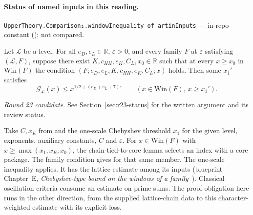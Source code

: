 

\paragraph{Status of named inputs in this reading.}
\noindent\nolinkurl{UpperTheory.Comparison₂.windowInequality_of_artinInputs} --- in-repo constant (); not compared.\par

\begin{formalstatement}\label{pn:P017}
Let $\mathcal L$ be a level. For all $e_D,e_L\in\mathbb R$, $\varepsilon>0$, and every family $F$ at $\varepsilon$ satisfying $(\mathcal L,F)$, suppose there exist $K,c_{HH},e_K,C_L,x_0\in\mathbb R$ such that at every $x\ge x_0$ in $\mathrm{Win}(F)$ the condition $(F;e_D,e_L,K,c_{HH},e_K,C_L;x)$ holds. Then some $x_1'$ satisfies
\[
 \mathcal G_{\mathcal L}(x)\le x^{1/2+(e_D+e_L+7)\varepsilon}
 \qquad(x\in\mathrm{Win}(F),\ x\ge x_1').
\]
\end{formalstatement}
 \noindent\emph{Round 23 candidate.} See Section~\ref{sec:r23-status} for the written argument and its review status.\par
\begin{formalroute}
Take $C,x_E$ from  and the one-scale Chebyshev threshold $x_1$ for the given level, exponents, auxiliary constants, $C$ and $\varepsilon$. For $x\in\mathrm{Win}(F)$ with $x\ge\max(x_1,x_E,x_0)$, the chain-tied-to-core lemma selects an index with a core package. The family condition gives  for that same member. The one-scale inequality  applies. It has the lattice estimate among its inputs (blueprint Chapter~E, \emph{Chebyshev-type bound on the windows of a family}~). Classical oscillation criteria consume an estimate on prime sums. The proof obligation here runs in the other direction, from the supplied lattice-chain data to this character-weighted estimate with its explicit loss.
\end{formalroute}

